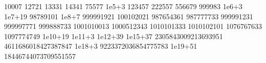 10007
12721
13331
14341
75577
1e5+3
123457
222557
556679
999983
1e6+3
1e7+19
98789101
1e8+7
999991921
100102021
987654361
987777733
999991231
999997771
999888733
1001010013
1000512343
1010101333
1010102101
1076767633
1097774749
1e10+19
1e11+3
1e12+39
1e15+37
2305843009213693951
4611686018427387847
1e18+3
9223372036854775783
1e19+51
18446744073709551557
